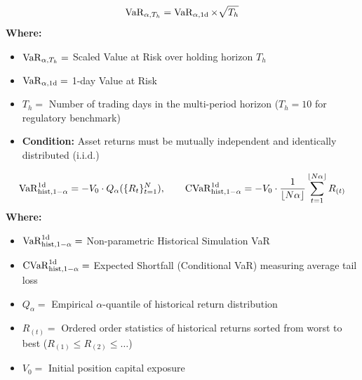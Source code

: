 \begin{formulabox}
\begin{equation*}
\operatorname{VaR}_{\alpha, T_h} = \operatorname{VaR}_{\alpha, 1\text{d}} \times \sqrt{T_h}
\end{equation*}
\textbf{Where:}
\begin{itemize}[leftmargin=1.8em, noitemsep]
    \item $\operatorname{VaR}_{\alpha, T_h} =$ Scaled Value at Risk over holding horizon $T_h$
    \item $\operatorname{VaR}_{\alpha, 1\text{d}} =$ 1-day Value at Risk
    \item $T_h =$ Number of trading days in the multi-period horizon ($T_h = 10$ for regulatory benchmark)
    \item \textbf{Condition:} Asset returns must be mutually independent and identically distributed ($\text{i.i.d.}$)
\end{itemize}
\end{formulabox}

\begin{formulabox}
\begin{equation*}
\operatorname{VaR}_{\text{hist}, 1-\alpha}^{1\text{d}} = - V_0 \cdot Q_{\alpha}(\{R_t\}_{t=1}^N), \qquad \operatorname{CVaR}_{\text{hist}, 1-\alpha}^{1\text{d}} = - V_0 \cdot \frac{1}{\lfloor N \alpha \rfloor} \sum_{t=1}^{\lfloor N \alpha \rfloor} R_{(t)}
\end{equation*}
\textbf{Where:}
\begin{itemize}[leftmargin=1.8em, noitemsep]
    \item $\operatorname{VaR}_{\text{hist}, 1-\alpha}^{1\text{d}} =$ Non-parametric Historical Simulation VaR
    \item $\operatorname{CVaR}_{\text{hist}, 1-\alpha}^{1\text{d}} =$ Expected Shortfall (Conditional VaR) measuring average tail loss
    \item $Q_{\alpha} =$ Empirical $\alpha$-quantile of historical return distribution
    \item $R_{(t)} =$ Ordered order statistics of historical returns sorted from worst to best ($R_{(1)} \le R_{(2)} \le \dots$)
    \item $V_0 =$ Initial position capital exposure
\end{itemize}
\end{formulabox}

